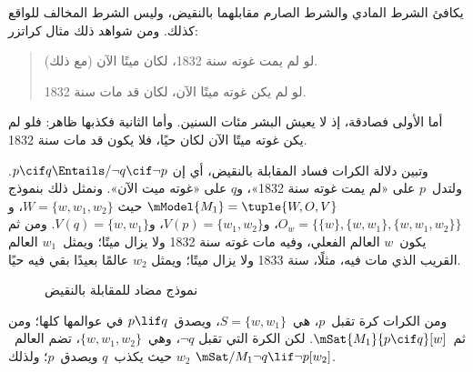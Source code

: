 \documentclass[../../../include/open-logic-section]{subfiles}
\begin{document}


يكافئ الشرط المادي والشرط الصارم مقابلهما بالنقيض، وليس الشرط المخالف
للواقع كذلك. ومن شواهد ذلك مثال كراتزر:
\begin{quote}
  لو لم يمت غوته سنة 1832، لكان ميتًا الآن (مع ذلك).

  لو لم يكن غوته ميتًا الآن، لكان قد مات سنة 1832.
\end{quote}
أما الأولى فصادقة، إذ لا يعيش البشر مئات السنين. وأما الثانية فكذبها
ظاهر: فلو لم يكن غوته ميتًا الآن لكان حيًا، فلا يكون قد مات سنة 1832.

\begin{ex}
  وتبين دلالة الكرات فساد المقابلة بالنقيض، أي إن
  $p \cif q \Entails/ \lnot q \cif \lnot p$. ولتدل~$p$ على «لم يمت
  غوته سنة 1832»، و$q$ على «غوته ميت الآن». ونمثل ذلك بنموذج
  $\mModel{M_1} = \tuple{W, O, V}$ حيث
  $W = \{w, w_1, w_2\}$،
  و$O_w = \{\{w\}, \{w, w_1\}, \{w, w_1, w_2\}\}$،
  و$V(p) = \{w_1, w_2\}$، و$V(q) = \{w, w_1\}$. ومن ثم يكون~$w$
  العالم الفعلي، وفيه مات غوته سنة 1832 ولا يزال ميتًا؛ ويمثل~$w_1$
  العالم القريب الذي مات فيه، مثلًا، سنة 1833 ولا يزال ميتًا؛ ويمثل
  $w_2$ عالمًا بعيدًا بقي فيه حيًا.
\begin{figure}
\begin{center}
\caption{نموذج مضاد للمقابلة بالنقيض}
\end{center}
\end{figure}
ومن الكرات كرة تقبل~$p$، هي~$S = \{w, w_1\}$، ويصدق~$p \lif q$ في
عوالمها كلها؛ ومن ثم~$\mSat{M_1}{p \cif q}[w]$. لكن الكرة التي تقبل
$\lnot q$، وهي~$\{w, w_1, w_2\}$، تضم العالم~$w_2$ حيث يكذب~$q$
ويصدق~$p$؛ ولذلك
$\mSat/{M_1}{\lnot q \lif \lnot p}[w_2]$.
\end{ex}
\end{document}
